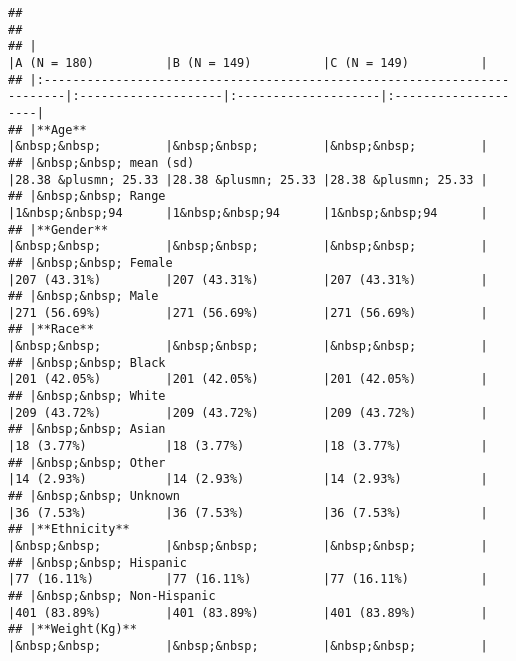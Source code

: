 \documentclass[
]{article}
\begin{document}
\begin{verbatim}
## 
## 
## |                                                                          |A (N = 180)          |B (N = 149)          |C (N = 149)          |
## |:-------------------------------------------------------------------------|:--------------------|:--------------------|:--------------------|
## |**Age**                                                                   |&nbsp;&nbsp;         |&nbsp;&nbsp;         |&nbsp;&nbsp;         |
## |&nbsp;&nbsp; mean (sd)                                                    |28.38 &plusmn; 25.33 |28.38 &plusmn; 25.33 |28.38 &plusmn; 25.33 |
## |&nbsp;&nbsp; Range                                                        |1&nbsp;&nbsp;94      |1&nbsp;&nbsp;94      |1&nbsp;&nbsp;94      |
## |**Gender**                                                                |&nbsp;&nbsp;         |&nbsp;&nbsp;         |&nbsp;&nbsp;         |
## |&nbsp;&nbsp; Female                                                       |207 (43.31%)         |207 (43.31%)         |207 (43.31%)         |
## |&nbsp;&nbsp; Male                                                         |271 (56.69%)         |271 (56.69%)         |271 (56.69%)         |
## |**Race**                                                                  |&nbsp;&nbsp;         |&nbsp;&nbsp;         |&nbsp;&nbsp;         |
## |&nbsp;&nbsp; Black                                                        |201 (42.05%)         |201 (42.05%)         |201 (42.05%)         |
## |&nbsp;&nbsp; White                                                        |209 (43.72%)         |209 (43.72%)         |209 (43.72%)         |
## |&nbsp;&nbsp; Asian                                                        |18 (3.77%)           |18 (3.77%)           |18 (3.77%)           |
## |&nbsp;&nbsp; Other                                                        |14 (2.93%)           |14 (2.93%)           |14 (2.93%)           |
## |&nbsp;&nbsp; Unknown                                                      |36 (7.53%)           |36 (7.53%)           |36 (7.53%)           |
## |**Ethnicity**                                                             |&nbsp;&nbsp;         |&nbsp;&nbsp;         |&nbsp;&nbsp;         |
## |&nbsp;&nbsp; Hispanic                                                     |77 (16.11%)          |77 (16.11%)          |77 (16.11%)          |
## |&nbsp;&nbsp; Non-Hispanic                                                 |401 (83.89%)         |401 (83.89%)         |401 (83.89%)         |
## |**Weight(Kg)**                                                            |&nbsp;&nbsp;         |&nbsp;&nbsp;         |&nbsp;&nbsp;         |

\end{verbatim}
\end{document}

